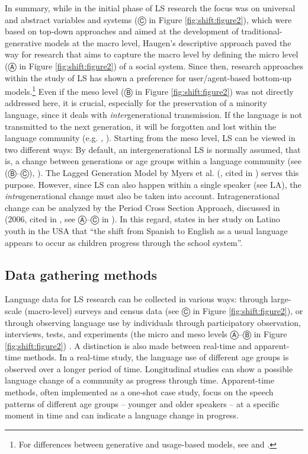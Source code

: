 \documentclass[output=paper]{langscibook}
\begin{document}
In summary, while in the initial phase of LS research the focus was on universal and abstract variables and systems (Ⓒ in Figure \ref{fig:shift:figure2}), which were based on top-down approaches and aimed at the development of traditional-generative models at the macro level, Haugen's \parencite*{Haugen1972} descriptive approach paved the way for research that aims to capture the macro level by defining the micro level (Ⓐ in Figure \ref{fig:shift:figure2}) of a social system. Since then, research approaches within the study of LS has shown a preference for user/agent-based bottom-up models.\footnote{For differences between generative and usage-based models, see \textcite{Langacker2000} and \textcite{Prochazka2017}.} Even if the meso level (Ⓑ in Figure \ref{fig:shift:figure2}) was not directly addressed here, it is crucial, especially for the preservation of a minority language, since it deals with \emph{inter}generational transmission. If the language is not transmitted to the next generation, it will be forgotten and lost within the language community (e.g. \citealt{Gal1979}, \citealt{Brenzinger2003}). Starting from the meso level, LS can be viewed in two different ways: By default, an intergenerational LS is normally assumed, that is, a change between generations or age groups within a language community (see  (Ⓑ--Ⓒ), \citealt{Lieberson1980}). The Lagged Generation Model by Myers et al. (\citeyear{MyersEtAl2006}, cited in \cite{Ortman2008}) serves this purpose. However, since LS can also happen within a single speaker (see LA), the \emph{intra}generational change must also be taken into account. Intragenerational change can be analyzed by the Period Cross Section Approach, discussed in \citeauthor*{MyersEtAl2006} (2006, cited in \citealt{Ortman2008}, see Ⓐ--Ⓒ in ).
In this regard, \textcite[1423--1424]{Lutz2006} states in her study on Latino youth in the USA that ``the shift from Spanish to English as a usual language appears to occur as children progress through the school system''.

\subsection{Data gathering methods}

Language data for LS research can be collected in various ways: through large-scale (macro-level) surveys and census data (see Ⓒ in Figure \ref{fig:shift:figure2}), or through observing language use by individuals through participatory observation, interviews, tests, and experiments (the micro and meso levels Ⓐ--Ⓑ in Figure \ref{fig:shift:figure2}) \parencite[48]{Pauwels2016}. A distinction is also made between real-time and apparent-time methods. In a real-time study, the language use of different age groups is observed over a longer period of time. Longitudinal studies can show a possible language change of a community as progress through time. Apparent-time methods, often implemented as a one-shot case study, focus on the speech patterns of different age groups -- younger and older speakers -- at a specific moment in time and can indicate a language change in progress.
\end{document}
